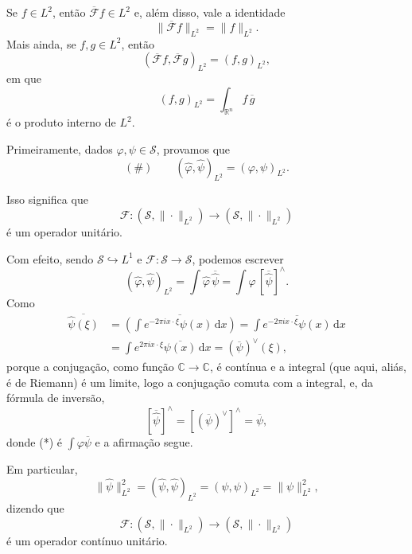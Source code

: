 \documentclass[../distribution_theory_notes.tex]{subfiles}
\begin{document}
\begin{lemma*}
	Se \(f\in L^2\), então \(\overline{\mathcal{F}}f\in L^2\) e, além disso, vale a identidade
	\[
		\|\overline{\mathcal{F}}f\|_{L^2}=\|f\|_{L^2}.
	\]
	Mais ainda, se \(f,g\in L^2\), então
	\[
		(\overline{\mathcal{F}}f,\overline{\mathcal{F}}g)_{L^2}=(f,g)_{L^2},
	\]
	em que
	\[
		(f,g)_{L^2}=\int_{\mathbb{R}^n}f\,\overline g
	\]
	é o produto interno de \(L^2\).
\end{lemma*}
\begin{proof*}
	Primeiramente, dados \(\varphi,\psi\in\mathcal{S}\), provamos que
	\[
		(\#)\qquad (\hat\varphi,\hat\psi)_{L^2}=(\varphi,\psi)_{L^2}.
	\]

	\begin{tcolorbox}[
			skin=enhanced,
			title=Observação,
			fonttitle=\bfseries,
			colframe=black,
			colbacktitle=cyan!75!white,
			colback=cyan!15,
			colbacklower=black,
			coltitle=black,
			drop fuzzy shadow
		]
		Isso significa que
		\[
			\mathcal{F}:(\mathcal{S},\|\cdot\|_{L^2})\longrightarrow(\mathcal{S},\|\cdot\|_{L^2})
		\]
		é um operador unitário.
	\end{tcolorbox}

	Com efeito, sendo \(\mathcal{S}\hookrightarrow L^1\) e \(\mathcal{F}:\mathcal{S}\to\mathcal{S}\), podemos escrever
	\[
		(\hat\varphi,\hat\psi)_{L^2}
		=\int \hat\varphi\,\overline{\hat\psi}
		=\int \varphi\,[\overline{\hat\psi}]^\wedge.\tag{*}
	\]
	Como
	\begin{align*}
		\overline{\hat\psi(\xi)}
		 & =\overline{\left(\int e^{-2\pi i x\cdot\xi}\psi(x)\,\mathrm{d}x\right)}
		=\int \overline{e^{-2\pi i x\cdot\xi}\psi(x)}\,\mathrm{d}x                 \\
		 & =\int e^{2\pi i x\cdot\xi}\overline{\psi(x)}\,\mathrm{d}x
		=(\overline\psi)^\vee(\xi),
	\end{align*}
	porque a conjugação, como função \(\mathbb{C}\to\mathbb{C}\), é contínua e a integral (que aqui, aliás, é de Riemann) é um limite, logo a conjugação comuta com a integral, e, da fórmula de inversão,
	\[
		[\overline{\hat\psi}]^\wedge=[(\overline\psi)^\vee]^\wedge=\overline\psi,
	\]
	donde (*) é \(\int\varphi\overline\psi\) e a afirmação segue.

	Em particular,
	\[
		\|\hat\psi\|_{L^2}^2
		=(\hat\psi,\hat\psi)_{L^2}
		=(\psi,\psi)_{L^2}
		=\|\psi\|_{L^2}^2,
	\]
	dizendo que
	\[
		\mathcal{F}:(\mathcal{S},\|\cdot\|_{L^2})\longrightarrow(\mathcal{S},\|\cdot\|_{L^2})
	\]
	é um operador contínuo unitário.


\end{proof*}
\end{document}
